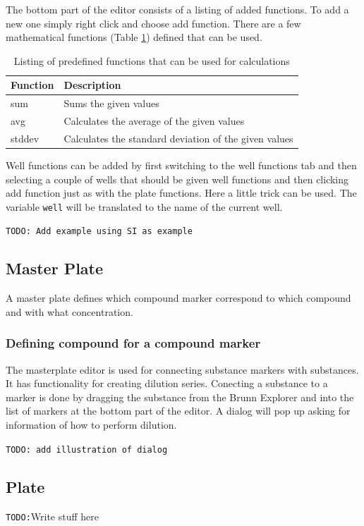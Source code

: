 \documentclass[a4paper,10pt]{article}
\begin{document}
                The bottom part of the editor consists of a listing of added
                functions. To add a new one simply right click and choose add
                function. There are a few mathematical functions (Table
                \ref{functions}) defined that can be used. 

                \begin{table}
                    \begin{center}
                        \begin{tabular}{l|l}
                            Function & Description \\
                            \hline
                            sum &    Sums the given values \\
                            avg &    Calculates the average of the
                                     given values \\
                            stddev & Calculates the standard deviation of the 
                                     given values \\
                        \end{tabular}
                    \end{center}
                    \caption{Listing of predefined functions that can be used
                             for calculations}
                    \label{functions}
                \end{table}
                
                Well functions can be added by first switching to the well
                functions tab and then selecting a couple of wells that should
                be given well functions and then clicking add function just as
                with the plate functions. Here a little trick can be used. The
                variable \texttt{well} will be translated to the name of the
                current well. 

                \texttt{TODO: Add example using SI as example}
        \subsection{Master Plate}
            A master plate defines which compound marker correspond to which
            compound and with what concentration.
            
            \subsubsection{Defining compound for a compound marker}
                The masterplate editor is used for connecting substance markers
                with substances. It has functionality for creating dilution
                series. Conecting a substance to a marker is done by dragging
                the substance from the Brunn Explorer and into the list of
                markers at the bottom part of the editor. A dialog will pop up
                asking for information of how to perform dilution.

                \texttt{TODO: add illustration of dialog}
        \subsection{Plate}
        \texttt{TODO:}Write stuff here
\end{document}
